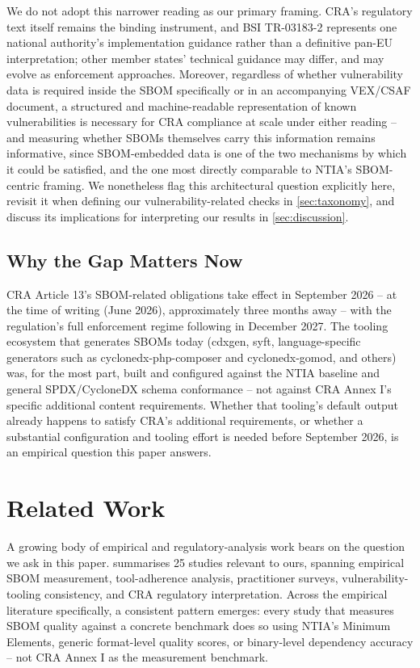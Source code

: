 \documentclass[11pt]{article}
\begin{document}
We do not adopt this narrower reading as our primary framing. CRA's regulatory text itself remains the binding instrument, and BSI TR-03183-2 represents one national authority's implementation guidance rather than a definitive pan-EU interpretation; other member states' technical guidance may differ, and may evolve as enforcement approaches. Moreover, regardless of whether vulnerability data is required inside the SBOM specifically or in an accompanying VEX/CSAF document, a structured and machine-readable representation of known vulnerabilities is necessary for CRA compliance at scale under either reading -- and measuring whether SBOMs themselves carry this information remains informative, since SBOM-embedded data is one of the two mechanisms by which it could be satisfied, and the one most directly comparable to NTIA's SBOM-centric framing. We nonetheless flag this architectural question explicitly here, revisit it when defining our vulnerability-related checks in \cref{sec:taxonomy}, and discuss its implications for interpreting our results in \cref{sec:discussion}.

\subsection{Why the Gap Matters Now}

CRA Article 13's SBOM-related obligations take effect in September 2026 -- at the time of writing (June 2026), approximately three months away -- with the regulation's full enforcement regime following in December 2027. The tooling ecosystem that generates SBOMs today (cdxgen, syft, language-specific generators such as cyclonedx-php-composer and cyclonedx-gomod, and others) was, for the most part, built and configured against the NTIA baseline and general SPDX/CycloneDX schema conformance -- not against CRA Annex I's specific additional content requirements. Whether that tooling's default output already happens to satisfy CRA's additional requirements, or whether a substantial configuration and tooling effort is needed before September 2026, is an empirical question this paper answers.

\section{Related Work}
\label{sec:related}

A growing body of empirical and regulatory-analysis work bears on the question we ask in this paper.  summarises 25 studies relevant to ours, spanning empirical SBOM measurement, tool-adherence analysis, practitioner surveys, vulnerability-tooling consistency, and CRA regulatory interpretation. Across the empirical literature specifically, a consistent pattern emerges: every study that measures SBOM quality against a concrete benchmark does so using NTIA's Minimum Elements, generic format-level quality scores, or binary-level dependency accuracy -- not CRA Annex I as the measurement benchmark.
\end{document}
